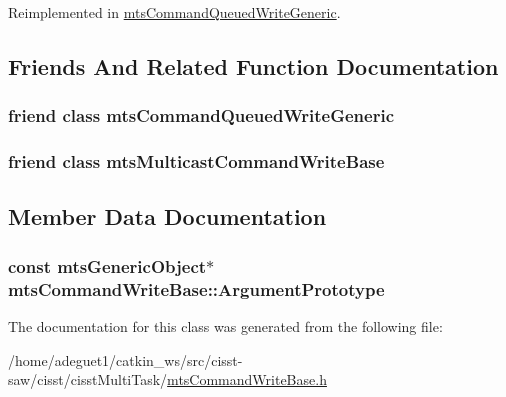 Reimplemented in \hyperlink{classmts_command_queued_write_generic_a49574e06b777c7122675adb3022993ef}{mts\-Command\-Queued\-Write\-Generic}.



\subsection{Friends And Related Function Documentation}
\hypertarget{classmts_command_write_base_aebd3531dc414cbd5c5aff710ecbfac4f}{
\subsubsection[{mts\-Command\-Queued\-Write\-Generic}]{\setlength{\rightskip}{0pt plus 5cm}friend class {\bf mts\-Command\-Queued\-Write\-Generic}\hspace{0.3cm}{\ttfamily [friend]}}}\label{classmts_command_write_base_aebd3531dc414cbd5c5aff710ecbfac4f}
\hypertarget{classmts_command_write_base_a01bea616c1ae77f302ccedbbc1300c12}{
\subsubsection[{mts\-Multicast\-Command\-Write\-Base}]{\setlength{\rightskip}{0pt plus 5cm}friend class {\bf mts\-Multicast\-Command\-Write\-Base}\hspace{0.3cm}{\ttfamily [friend]}}}\label{classmts_command_write_base_a01bea616c1ae77f302ccedbbc1300c12}


\subsection{Member Data Documentation}
\hypertarget{classmts_command_write_base_a92e316a7f32f52a18b47a02867b104d2}{
\subsubsection[{Argument\-Prototype}]{\setlength{\rightskip}{0pt plus 5cm}const {\bf mts\-Generic\-Object}$\ast$ mts\-Command\-Write\-Base\-::\-Argument\-Prototype\hspace{0.3cm}{\ttfamily [protected]}}}\label{classmts_command_write_base_a92e316a7f32f52a18b47a02867b104d2}


The documentation for this class was generated from the following file\-:\begin{DoxyCompactItemize}
\item 
/home/adeguet1/catkin\-\_\-ws/src/cisst-\/saw/cisst/cisst\-Multi\-Task/\hyperlink{mts_command_write_base_8h}{mts\-Command\-Write\-Base.\-h}\end{DoxyCompactItemize}
